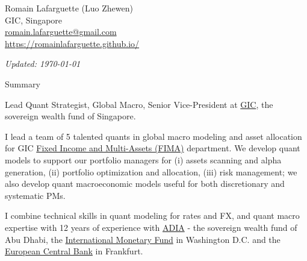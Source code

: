 \documentclass[usegeometry, 10pt, a4paper]{cv} %
\begin{document}
\hspace{10mm}
\begin{chapeau}
\begin{adresse}
\begin{flushleft}
    Romain Lafarguette (Luo Zhewen)\\
    GIC, Singapore \\
    \href{mailto:romain.lafarguette@gmail.com}{romain.lafarguette@gmail.com}\\
    \url{https://romainlafarguette.github.io/} \\
\end{flushleft}
\end{adresse}
\begin{etatcivil}
\begin{flushleft}
  \hspace{15mm} \emph{Updated: \monthyeardate\today}\\
\end{flushleft}
\end{etatcivil}
\end{chapeau}

\begin{rubriquetableau}[0.95\textwidth]{Summary}\\
  \vspace{-0.5cm}

Lead Quant Strategist, Global Macro, Senior Vice-President at \href{https://www.gic.com.sg/}{GIC}, the sovereign  wealth fund of
Singapore. \bigskip

I lead a team of 5 talented quants in global macro modeling and asset allocation for GIC \href{https://www.gic.com.sg/how-we-invest/investment-groups/}{Fixed Income and Multi-Assets (FIMA)} department. We develop quant models to support our portfolio managers for (i) assets scanning and alpha generation, (ii) portfolio optimization and allocation, (iii) risk management; we also develop quant macroeconomic models useful for both discretionary and systematic PMs. \bigskip

I combine technical skills in quant modeling for rates and FX, and quant macro expertise with 12 years of experience with \href{https://www.adia.ae/}{ADIA} - the sovereign wealth fund of Abu Dhabi, the \href{https://www.imf.org/en/Home}{International Monetary Fund} in Washington D.C. and the \href{https://www.ecb.europa.eu/home/html/index.en.html}{European Central Bank} in Frankfurt.\\ 

\end{rubriquetableau}
\end{document}
